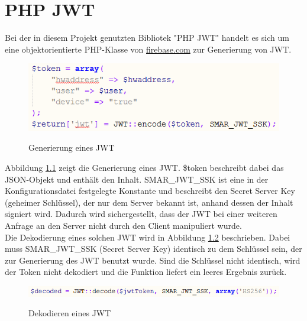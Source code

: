 \chapter{\ac{PHP} \ac{JWT}}
\label{cha:jwt}
\sloppy

Bei der in diesem Projekt genutzten Bibliotek "PHP JWT" handelt es sich um eine objektorientierte \ac{PHP}-Klasse von \mbox{\url{firebase.com}} zur Generierung von \acl{JWT}.\\

\fussy
\begin{figure}[H]
	\centering
	{\includegraphics[scale=1.0]{Bilder/jwt_encode.png}}
	\caption{Generierung eines \acs{JWT}}
	\label{fig:jwt_encode}
\end{figure}

Abbildung \ref{fig:jwt_encode} zeigt die Generierung eines \ac{JWT}. \$token beschreibt dabei das \ac{JSON}-Objekt und enthält den Inhalt. SMAR\_JWT\_SSK ist eine in der Konfigurationsdatei festgelegte Konstante und beschreibt den Secret Server Key (geheimer Schlüssel), der nur dem Server bekannt ist, anhand dessen der Inhalt signiert wird. Dadurch wird sichergestellt, dass der \ac{JWT} bei einer weiteren Anfrage an den Server nicht durch den Client manipuliert wurde.\\

Die Dekodierung eines solchen \acl{JWT} wird in Abbildung \ref{fig:jwt_decode} beschrieben. Dabei muss SMAR\_JWT\_SSK (Secret Server Key) identisch zu dem Schlüssel sein, der zur Generierung des \ac{JWT} benutzt wurde. Sind die Schlüssel nicht identisch, wird der Token nicht dekodiert und die Funktion liefert ein leeres Ergebnis zurück.\\

\begin{figure}[H]
	\centering
	{\includegraphics[scale=1.0]{Bilder/jwt_decode.png}}
	\caption{Dekodieren eines \acs{JWT}}
	\label{fig:jwt_decode}
\end{figure}

